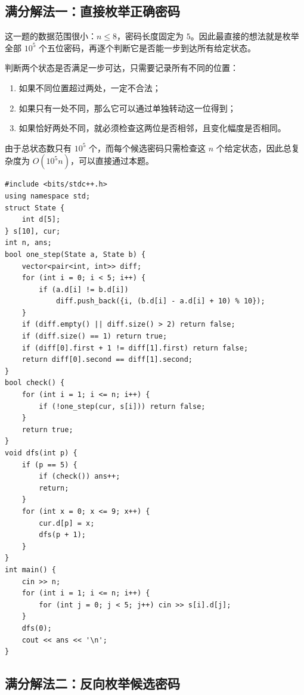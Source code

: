 \documentclass{book}
\begin{document}
    \subsection{满分解法一：直接枚举正确密码}

    这一题的数据范围很小：$n \le 8$，密码长度固定为 $5$。因此最直接的想法就是枚举全部 $10^5$ 个五位密码，再逐个判断它是否能一步到达所有给定状态。

    判断两个状态是否满足一步可达，只需要记录所有不同的位置：

    \begin{enumerate}[leftmargin=2em,itemsep=1pt,topsep=2pt,parsep=0pt,partopsep=0pt]
        \item 如果不同位置超过两处，一定不合法；
        \item 如果只有一处不同，那么它可以通过单独转动这一位得到；
        \item 如果恰好两处不同，就必须检查这两位是否相邻，且变化幅度是否相同。
    \end{enumerate}

    由于总状态数只有 $10^5$ 个，而每个候选密码只需检查这 $n$ 个给定状态，因此总复杂度为 $O(10^5 n)$，可以直接通过本题。

\newpage
    \begin{lstlisting}[style = code]
#include <bits/stdc++.h>
using namespace std;
struct State {
    int d[5];
} s[10], cur;
int n, ans;
bool one_step(State a, State b) {
    vector<pair<int, int>> diff;
    for (int i = 0; i < 5; i++) {
        if (a.d[i] != b.d[i]) 
            diff.push_back({i, (b.d[i] - a.d[i] + 10) % 10});
    }
    if (diff.empty() || diff.size() > 2) return false;
    if (diff.size() == 1) return true;
    if (diff[0].first + 1 != diff[1].first) return false;
    return diff[0].second == diff[1].second;
}
bool check() {
    for (int i = 1; i <= n; i++) {
        if (!one_step(cur, s[i])) return false;
    }
    return true;
}
void dfs(int p) {
    if (p == 5) {
        if (check()) ans++;
        return;
    }
    for (int x = 0; x <= 9; x++) {
        cur.d[p] = x;
        dfs(p + 1);
    }
}
int main() {
    cin >> n;
    for (int i = 1; i <= n; i++) {
        for (int j = 0; j < 5; j++) cin >> s[i].d[j];
    }
    dfs(0);
    cout << ans << '\n';
}\end{lstlisting}

    \subsection{满分解法二：反向枚举候选密码}
\end{document}
